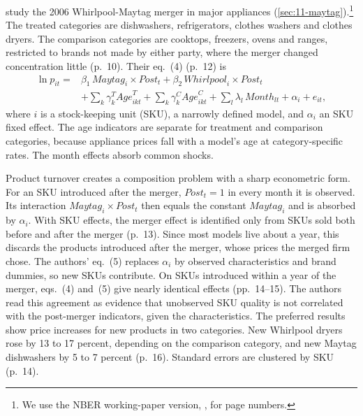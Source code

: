 \citet{AshenfelterHoskenWeinberg2013} study the 2006 Whirlpool-Maytag merger in major appliances
(\cref{sec:11-maytag}).\footnote{We use the NBER working-paper version, \citet{AshenfelterHoskenWeinberg2011}, for page
numbers.} The treated categories are dishwashers, refrigerators, clothes washers and clothes dryers. The comparison
categories are cooktops, freezers, ovens and ranges, restricted to brands not made by either party, where the merger
changed concentration little (p.~10). Their eq.~(4) (p.~12) is
\begin{equation}\label{eq:A-ahw4}
\begin{split}
\ln p_{it}={}&\beta_1\,\mathit{Maytag}_i\times\mathit{Post}_t+\beta_2\,\mathit{Whirlpool}_i\times\mathit{Post}_t\\
&+\sum_k\gamma^T_k\mathit{Age}^T_{ikt}+\sum_k\gamma^C_k\mathit{Age}^C_{ikt}+\sum_l\lambda_l\,\mathit{Month}_{lt}+\alpha_i+e_{it},
\end{split}
\end{equation}
where $i$ is a stock-keeping unit (SKU), a narrowly defined model, and $\alpha_i$ an SKU fixed effect. The age
indicators are separate for treatment and comparison categories, because appliance prices fall with a model's age at
category-specific rates. The month effects absorb common shocks.

Product turnover creates a composition problem with a sharp econometric form. For an SKU introduced after the merger,
$\mathit{Post}_t=1$ in every month it is observed. Its interaction $\mathit{Maytag}_i\times\mathit{Post}_t$ then
equals the constant $\mathit{Maytag}_i$ and is absorbed by $\alpha_i$. With SKU effects, the merger effect is
identified only from SKUs sold both before and after the merger (p.~13). Since most models live about a year, this
discards the products introduced after the merger, whose prices the merged firm chose. The authors' eq.~(5) replaces
$\alpha_i$ by observed characteristics and brand dummies, so new SKUs contribute. On SKUs introduced within a year of
the merger, eqs.~(4) and~(5) give nearly identical effects (pp.~14--15). The authors read this agreement as evidence
that unobserved SKU quality is not correlated with the post-merger indicators, given the characteristics. The preferred results
show price increases for new products in two categories. New Whirlpool dryers rose by 13 to 17 percent, depending on
the comparison category, and new Maytag dishwashers by 5 to 7 percent (p.~16). Standard errors are clustered by SKU
(p.~14).

